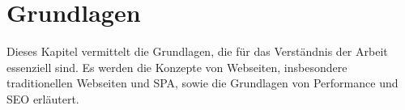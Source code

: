 
\section{Grundlagen}
Dieses Kapitel vermittelt die Grundlagen, die für das Verständnis der Arbeit essenziell sind.
Es werden die Konzepte von Webseiten, insbesondere traditionellen Webseiten und \ac{SPA}, sowie die Grundlagen von Performance und \ac{SEO} erläutert.

